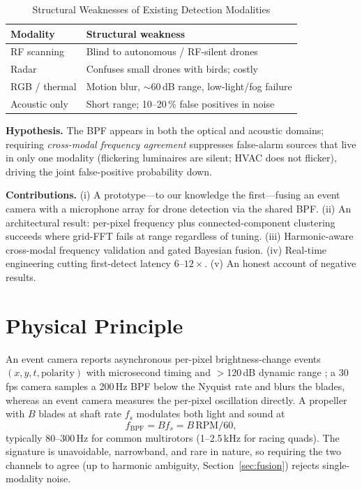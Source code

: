 \documentclass[conference]{IEEEtran}
\begin{document}
\begin{table}[t]
\caption{Structural Weaknesses of Existing Detection Modalities}
\label{tab:modalities}
\centering
\small
\begin{tabular}{@{}lp{5.4cm}@{}}
\toprule
\textbf{Modality} & \textbf{Structural weakness} \\
\midrule
RF scanning & Blind to autonomous / RF-silent drones \\
Radar & Confuses small drones with birds; costly \\
RGB / thermal & Motion blur, ${\sim}60$\,dB range, low-light/fog failure \\
Acoustic only & Short range; 10--20\,\% false positives in noise \\
\bottomrule
\end{tabular}
\end{table}

\textbf{Hypothesis.} The BPF appears in both the optical and acoustic
domains; requiring \emph{cross-modal frequency agreement} suppresses
false-alarm sources that live in only one modality (flickering luminaires
are silent; HVAC does not flicker), driving the joint false-positive
probability down.

\textbf{Contributions.} (i) A prototype---to our knowledge the
first---fusing an event camera with a microphone array for drone detection
via the shared BPF. (ii) An architectural result: per-pixel frequency plus
connected-component clustering succeeds where grid-FFT fails at range
regardless of tuning. (iii) Harmonic-aware cross-modal frequency validation
and gated Bayesian fusion. (iv) Real-time engineering cutting first-detect
latency $6$--$12\times$. (v) An honest account of negative results.

\section{Physical Principle}
An event camera reports asynchronous per-pixel brightness-change events
$(x,y,t,\text{polarity})$ with microsecond timing and $>$120\,dB dynamic
range \cite{lichtsteiner2008,gallego2020,finateu2020}; a 30\,fps camera samples a
200\,Hz BPF below the Nyquist rate and blurs the blades, whereas an event
camera measures the per-pixel oscillation directly. A propeller with $B$
blades at shaft rate $f_s$ modulates both light and sound at
\begin{equation}
f_{\mathrm{BPF}} = B f_s = B\,\mathrm{RPM}/60,
\label{eq:bpf}
\end{equation}
typically 80--300\,Hz for common multirotors (1--2.5\,kHz for racing
quads). The signature is unavoidable, narrowband, and rare in nature, so
requiring the two channels to agree (up to harmonic ambiguity,
Section~\ref{sec:fusion}) rejects single-modality noise.
\end{document}
